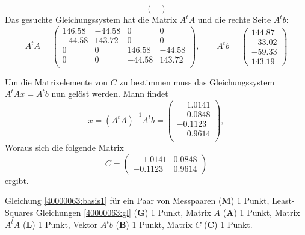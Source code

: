 \begin{loesung}
\begin{teilaufgaben}
\[\begin{pmatrix}
\end{pmatrix}
\]
Das gesuchte Gleichungssystem hat die Matrix $A^tA$ und die rechte
Seite $A^tb$:
\[
A^tA
=
\begin{pmatrix}
  146.58 & -44.58  &       0  &       0\\
  -44.58 & 143.72   &      0   &      0\\
         0   &      0  & 146.58 & -44.58\\
         0   &      0  & -44.58 & 143.72\\
\end{pmatrix}
,\qquad
A^tb=\begin{pmatrix}
    144.87\\
  -33.02\\
  -59.33\\
  143.19
  \end{pmatrix}
\]
\item
Um die Matrixelemente von $C$ zu bestimmen muss das Gleichungssystem
$A^tA x = A^tb $ nun gelöst werden. Mann findet
\[
  x = (A^tA)^{-1}A^tb = 
  \begin{pmatrix}
    \phantom{-}1.0141\\
    \phantom{-}0.0848\\
   -0.1123\\
    \phantom{-}0.9614\\ 
  \end{pmatrix},
\]
Woraus sich die folgende Matrix 
\[
  C =  \begin{pmatrix}
    \phantom{-}1.0141 & 0.0848\\
   -0.1123 & 0.9614 
  \end{pmatrix}
\]
ergibt.
\end{teilaufgaben}
\end{loesung}


\begin{bewertung}
Gleichung \eqref{40000063:basis1} für ein Paar von Messpaaren ({\bf M}) 1 Punkt,
Least-Squares Gleichungen \eqref{40000063:gl} ({\bf G}) 1 Punkt,
Matrix $A$ ({\bf A}) 1 Punkt,
Matrix $A^tA$ ({\bf L}) 1 Punkt,
Vektor $A^tb$ ({\bf B}) 1 Punkt,
Matrix $C$ ({\bf C}) 1 Punkt.
\end{bewertung}


